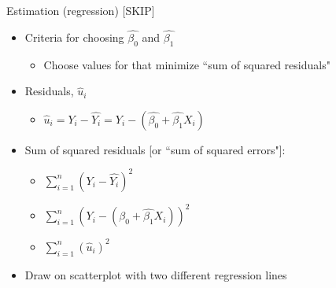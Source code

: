 \begin{frame}{Estimation (regression)  [SKIP]}
	\begin{itemize}
	\item Criteria for choosing $\hat{\beta_{0}}$ and $\hat{\beta_{1}}$
		\begin{itemize}
		\item Choose values for that minimize ``sum of squared residuals"
		\end{itemize}
	\item Residuals, $\hat u_{i}$
		\begin{itemize}
		\item $\hat u_{i} = Y_{i} - \hat{Y_{i}} = Y_{i} - (\hat{\beta_{0}} + \hat{\beta_{1}}X_{i})$
		\end{itemize}
	\item Sum of squared residuals [or ``sum of squared errors"]:
		\begin{itemize}
		\item $\sum_{i=1}^{n} (Y_{i} - \hat{Y_{i}})^{2}$
		\vspace{2mm}
		\item $\sum_{i=1}^{n} (Y_{i} - (\hat{\beta_{0}} + \hat{\beta_{1}}X_{i}))^{2}$
		\vspace{2mm}
		\item $\sum_{i=1}^{n} (\hat u_{i})^{2}$
		\end{itemize}
	\item Draw on scatterplot with two different regression lines
	\end{itemize}
\end{frame}


